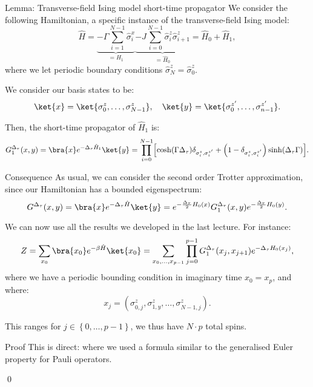 \documentclass[a4paper]{article}
\begin{document}
\begin{parag}{Lemma: Transverse-field Ising model short-time propagator}
    We consider the following Hamiltonian, a specific instance of the transverse-field Ising model: 
    \[\hat{H} = \underbrace{-\Gamma \sum_{i=1}^{N-1} \hat{\sigma}_i^x}_{= H_1} \underbrace{- J \sum_{i=0}^{N-1} \hat{\sigma}_i^z \hat{\sigma}_{i+1}^{z}}_{= \hat{H}_0} = \hat{H}_0 + \hat{H}_1,\]
    where we let periodic boundary conditions $\hat{\sigma}_N^z = \hat{\sigma}_0^z$.
    
    We consider our basis states to be: 
    \[\ket{x} = \ket{\sigma_0^z, \ldots, \sigma_{N-1}^z}, \mathspace \ket{y} = \ket{\sigma_0^{z'}, \ldots, \sigma_{n-1}^{z'}}.\]

    Then, the short-time propagator of $\hat{H}_1$ is: 
    \[G_1^{\Delta_{\tau}}\left(x, y\right) = \bra{x} e^{-\Delta_{\tau} \hat{H}_1} \ket{y}  = \prod_{i=0}^{N-1} \left[\cosh\left(\Gamma \Delta_{\tau}\right)\delta_{\sigma_i^z, \sigma_i^{z'}} + \left(1 - \delta_{\sigma_i^z, \sigma_i^{z'}}\right) \sinh\left(\Delta_{\tau} \Gamma\right)\right].\]
    
    \begin{subparag}{Consequence}
        As usual, we can consider the second order Trotter approximation, since our Hamiltonian has a bounded eigenspectrum:
        \[G^{\Delta_{\tau}}\left(x, y\right) = \bra{x} e^{-\Delta_{\tau} \hat{H}} \ket{y} = e^{-\frac{\Delta_{\tau}}{2} H_0\left(x\right)} G_1^{\Delta_{\tau}}\left(x, y\right) e^{- \frac{\Delta_{\tau}}{2} H_0\left(y\right)}.\]

        We can now use all the results we developed in the last lecture. For instance:
        \[Z = \sum_{x_0} \bra{x_0} e^{-\beta \hat{H}} \ket{x_0} = \sum_{x_0, \ldots, x_{p-1}} \prod_{j=0}^{p-1} G_1^{\Delta_{\tau}}\left(x_j, x_{j+1}\right) e^{-\Delta_{\tau} H_0\left(x_j\right)},\]
        where we have a periodic bounding condition in imaginary time $x_0 = x_p$, and where: 
        \[x_j = \left(\sigma_{0, j}^z, \sigma_{1, y}^z, \ldots, \sigma_{N-1, j}^z\right).\]
        
        This ranges for $j \in \left\{0, \ldots, p-1\right\}$, we thus have $N\cdot p$ total spins.
    \end{subparag}

    \begin{subparag}{Proof}
        This is direct:
        where we used a formula similar to the generalised Euler property for Pauli operators.

        \qed
    \end{subparag}
\end{parag}
\end{document}
